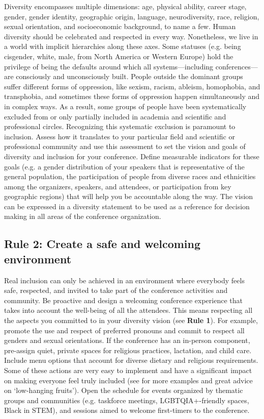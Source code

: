 \documentclass[10pt,letterpaper]{article}
\begin{document}
Diversity encompasses multiple dimensions: age, physical ability, career stage, gender, gender identity, geographic origin, language, neurodiversity, race, religion, sexual orientation, and socioeconomic background, to name a few.
Human diversity should be celebrated and respected in every way. 
Nonetheless, we live in a world with implicit hierarchies along these axes. 
Some statuses (e.g. being cisgender, white, male, from North America or Western Europe) hold the privilege of being the defaults around which all systems—including conferences—are consciously and unconsciously built. 
People outside the dominant groups suffer different forms of oppression, like sexism, racism, ableism, homophobia, and transphobia, and sometimes these forms of oppression happen simultaneously and in complex ways.
As a result, some groups of people have been systematically excluded from or only partially included in academia and scientific and professional circles.
Recognizing this systematic exclusion is paramount to inclusion.
Assess how it translates to your particular field and scientific or professional community and use this assessment to set the vision and goals of diversity and inclusion for your conference.
Define measurable indicators for these goals (e.g. a gender distribution of your speakers that is representative of the general population, the participation of people from diverse races and ethnicities among the organizers, speakers, and attendees, or participation from key geographic regions) that will help you be accountable along the way.
The vision can be expressed in a diversity statement to be used as a reference for decision making in all areas of the conference organization. 

\subsection*{Rule 2: Create a safe and welcoming environment}
\label{rule_inclusion}

Real inclusion can only be achieved in an environment where everybody feels safe, respected, and invited to take part of the conference activities and community. Be proactive and design a welcoming conference experience that takes into account the well-being of all the attendees. This means respecting all the aspects you committed to in your diversity vision (see \textbf{Rule 1}). For example, promote the use and respect of preferred pronouns and commit to respect all genders and sexual orientations. If the conference has an in-person component, pre-assign quiet, private spaces for religious practices, lactation, and child care. Include menu options that account for diverse dietary and religious requirements.
Some of these actions are very easy to implement and have a significant impact on making everyone feel truly included (see \cite{numfocus_discover_2021} for more examples and  great advice on `low-hanging fruits').
Open the schedule for events organized by thematic groups and communities (e.g. taskforce meetings, LGBTQIA+-friendly spaces, Black in STEM), and sessions aimed to welcome first-timers to the conference.
\end{document}
